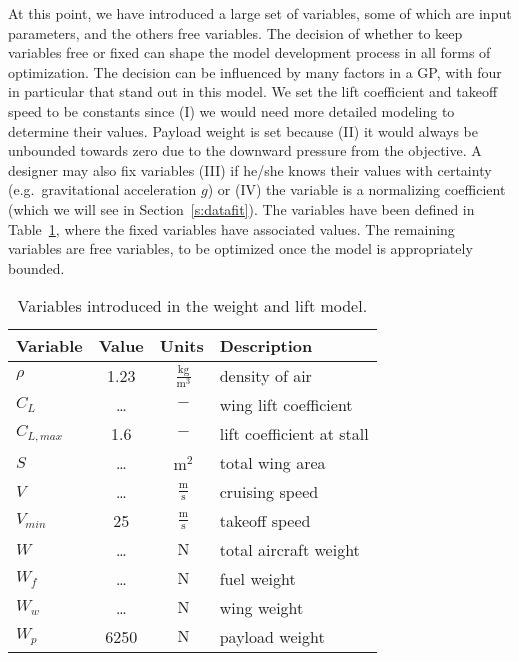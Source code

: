 At this point, we have introduced a large set of variables, some of which are input
parameters, and the others free variables. The decision of whether to keep variables free or fixed
can shape the model development process in all forms of optimization.
The decision can be influenced by many
factors in a \gls{GP}, with four in particular that stand out in this model.
We set the lift coefficient and takeoff speed
to be constants since (I) we would need
more detailed modeling to determine their values. Payload weight is set
because (II) it would always be unbounded towards zero due to the downward pressure from
the objective. A designer may also fix variables (III) if he/she knows their values with
certainty (e.g.\ gravitational acceleration $g$) or (IV) the variable is a normalizing
coefficient (which we will see in Section~\ref{s:datafit}).
The variables have been defined in Table~\ref{t:vars_WandL}, where the fixed variables
have associated values.
The remaining variables are free variables, to be optimized once the model
is appropriately bounded.

\begin{footnotesize}
\begin{table}
    \centering
    \begin{tabular}{ l c c l}
        \toprule
        \textbf{Variable} & \textbf{Value} & \textbf{Units} & \textbf{Description} \\
        \midrule
        $\rho$ & 1.23 & $~\mathrm{\tfrac{kg}{m^{3}}}$ & density of air \\
        $C_L$ & \ldots & $~\mathrm{-}$ & wing lift coefficient \\
        $C_{L,max}$ & 1.6 & $~\mathrm{-}$ & lift coefficient at stall \\
        $S$ & \ldots & $~\mathrm{m^{2}}$ & total wing area \\
        $V$ & \ldots & $~\mathrm{\tfrac{m}{s}}$ & cruising speed \\
        $V_{min}$ & 25 & $~\mathrm{\tfrac{m}{s}}$ & takeoff speed \\
        $W$ & \ldots & $~\mathrm{N}$ & total aircraft weight \\
        $W_f$ & \ldots & $~\mathrm{N}$ & fuel weight \\
        $W_w$ & \ldots & $~\mathrm{N}$ & wing weight \\
        $W_p$ & 6250 & $~\mathrm{N}$ & payload weight \\
        \bottomrule
    \end{tabular}
    \caption{Variables introduced in the weight and lift model.}
    \label{t:vars_WandL}
\end{table} \end{footnotesize}

